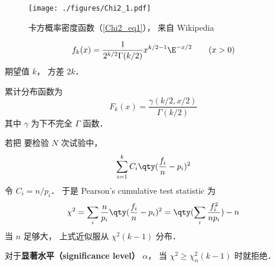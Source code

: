 
\begin{issues}
\issueDraft
\end{issues}

\begin{figure}[ht]
\centering
\texttt{[image: ./figures/Chi2\_1.pdf]}
\caption{卡方概率密度函数（\autoref{Chi2_eq1}）， 来自 Wikipedia} \label{Chi2_fig1}
\end{figure}

\begin{equation}\label{Chi2_eq1}
f_k(x) = \frac{1}{2^{k/2}\Gamma(k/2)}x^{k/2-1}\E^{-x/2} \qquad (x > 0)
\end{equation}
期望值 $k$， 方差 $2k$．

累计分布函数为
\begin{equation}
F_k(x) = \frac{\gamma(k/2, x/2)}{\Gamma(k/2)}
\end{equation}
其中 $\gamma$ 为下不完全 $\Gamma$ 函数．


若把 要检验 $N$ 次试验中， 
\begin{equation}
\sum_{i=1}^k C_i \qty(\frac{f_i}{n} - p_i)^2
\end{equation}
令 $C_i = n/p_i$． 于是 Pearson's cumulative test statistic 为
\begin{equation}
\chi^2 = \sum_i \frac{n}{p_i} \qty(\frac{f_i}{n} - p_i)^2 = \qty(\sum_i \frac{f_i^2}{np_i}) - n
\end{equation}
当 $n$ 足够大， 上式近似服从 $\chi^2(k-1)$ 分布．

对于\textbf{显著水平（significance level）} $\alpha$， 当 $\chi^2 \geqslant \chi_\alpha^2(k-1)$ 时就拒绝．

